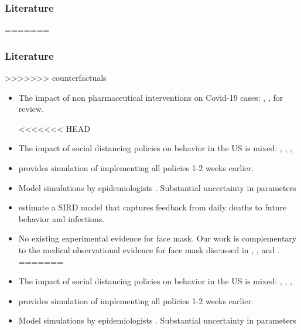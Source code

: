 \documentclass{beamer}
\begin{document}
\begin{frame}
  \frametitle{Literature}%
 
=======






\begin{frame}
  \frametitle{Literature}%

>>>>>>> counterfactuals
 \footnotesize
\begin{itemize}

\item The impact of non
pharmaceutical interventions on Covid-19  cases:  \cite{hsiang2020},  \cite{courtemanche2020},  \cite{avery2020} for review.

<<<<<<< HEAD
\item The impact of social distancing policies on behavior in the US is mixed:  \cite{abouk2020}, \cite{maloney2020},  \cite{gupta2020}, \cite{anderson2020} 

\item \cite{pei2020}  provides simulation of implementing all policies 1-2 weeks earlier.  

\item Model simulations by epidemiologists  \citep[e.g.,][]{ferguson2020}. Substantial uncertainty in parameters  \citep{avery2020,
 stock2020}
 
 \item  \cite{NBERw27128} estimate a SIRD model that captures feedback from daily deaths
to future behavior and infections.

\item No existing experimental evidence for face mask. Our work is complementary to the medical observational evidence  for face mask discussed in  \cite{Greenhalghm2020}, \cite{howard2020}, and 
\cite{zhangr2020}. 
=======
\item The impact of social distancing policies on behavior in the US is mixed:  \cite{abouk2020}, \cite{maloney2020},  \cite{gupta2020}, \cite{anderson2020}

\item \cite{pei2020}  provides simulation of implementing all policies 1-2 weeks earlier.

\item Model simulations by epidemiologists  \citep[e.g.,][]{ferguson2020}. Substantial uncertainty in parameters  \citep{avery2020,
 stock2020}


\end{itemize}
\end{frame}
\end{frame}
\end{document}
